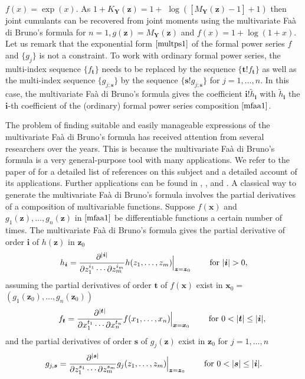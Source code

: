 \(f(x)=\exp(x).\) As \(1 + K_{\boldsymbol{Y}}(\boldsymbol{z})=1 +\)
\(\log([M_{\boldsymbol{Y}}(\boldsymbol{z})-1]+1)\) then joint cumulants
can be recovered from joint moments using the multivariate Faà di
Bruno's formula for
\(n=1, g(\boldsymbol{z}) = M_{\boldsymbol{Y}}(\boldsymbol{z})\) and
\(f(x)= 1 + \log (1 + x).\) Let us remark that the exponential form
\(\eqref{multps1}\) of the formal power series \(f\) and \(\{g_j\}\) is
not a constraint. To work with ordinary formal power series, the
multi-index sequence \(\{f_{\boldsymbol{t}}\}\) needs to be replaced by
the sequence \(\{\boldsymbol{t}! f_{\boldsymbol{t}}\}\) as well as the
multi-index sequence \(\{g_{j; \boldsymbol{s}}\}\) by the sequence
\(\{\boldsymbol{s}! g_{j; \boldsymbol{s}}\}\) for \(j=1, \ldots,n.\) In
this case, the multivariate Faà di Bruno's formula gives the coefficient
\({\boldsymbol{i}!} \tilde{h}_{\boldsymbol{i}}\) with
\(\tilde{h}_{\boldsymbol{i}}\) the \({\boldsymbol{i}}\)-th coefficient
of the (ordinary) formal power series composition \(\eqref{mfaa1}\).

The problem of finding suitable and easily manageable expressions of the
multivariate Faà di Bruno's formula has received attention from several
researchers over the years. This is because the multivariate Faà di
Bruno's formula is a very general-purpose tool with many applications.
We refer to the paper of \citet{MR2326318} for a detailed list of
references on this subject and a detailed account of its applications.
Further applications can be found in \citet{MR2301629},
\citet{MR3375628}, \citet{MR3707509} and \citet{PrivaultArxiv}. A
classical way to generate the multivariate Faà di Bruno's formula
involves the partial derivatives of a composition of multivariable
functions. Suppose \(f(\boldsymbol{x})\) and
\(g_1(\boldsymbol{z}), \ldots, g_n(\boldsymbol{z})\) in
\(\eqref{mfaa1}\) be differentiable functions a certain number of times.
The multivariate Faà di Bruno's formula gives the partial derivative of
order \(\boldsymbol{i}\) of \(h(\boldsymbol{z})\) in
\(\boldsymbol{z}_0\) \begin{equation}\label{(hi)}
h_{\boldsymbol{i}} = \frac{\partial^{|\boldsymbol{i}|}}{\partial z_1^{i_1} \cdots
\partial z_m^{i_m}} h(z_1, \ldots, z_m) \!\!\Bigm\lvert_{\boldsymbol{z}=\boldsymbol{z}_0} \qquad \hbox{for $|\boldsymbol{i}|>0,$}
\end{equation} assuming the partial derivatives of order
\(\boldsymbol{t}\) of \(f(\boldsymbol{x})\) exist in
\(\boldsymbol{x}_0=\)
\(\left(g_1(\boldsymbol{z}_0), \ldots,g_n(\boldsymbol{z}_0)\right)\)
\[ \qquad f_{\boldsymbol{t}} = \frac{\partial^{|\boldsymbol{t}|}}{\partial x_1^{t_1} \cdots
\partial x_n^{t_n}} f(x_1, \ldots, x_n) \!\!\Bigm\lvert_{\boldsymbol{x}=\boldsymbol{x}_0}  \qquad \hbox{for $0 < |\boldsymbol{t}| \leq |\boldsymbol{i}|,$}\]
and the partial derivatives of order \(\boldsymbol{s}\) of
\(g_j(\boldsymbol{z})\) exist in \(\boldsymbol{z}_0\) for
\(j=1,\ldots,n\) \[g_{j,\boldsymbol{s}} = 
\frac{\partial^{|\boldsymbol{s}|}}{\partial z_1^{s_1} \cdots
\partial z_m^{s_m}} g_j(z_1, \ldots, z_m) \!\!\Bigm\lvert_{\boldsymbol{z}=\boldsymbol{z}_0} \qquad \hbox{for $0 < |\boldsymbol{s}| \leq |\boldsymbol{i}|$}.\]

